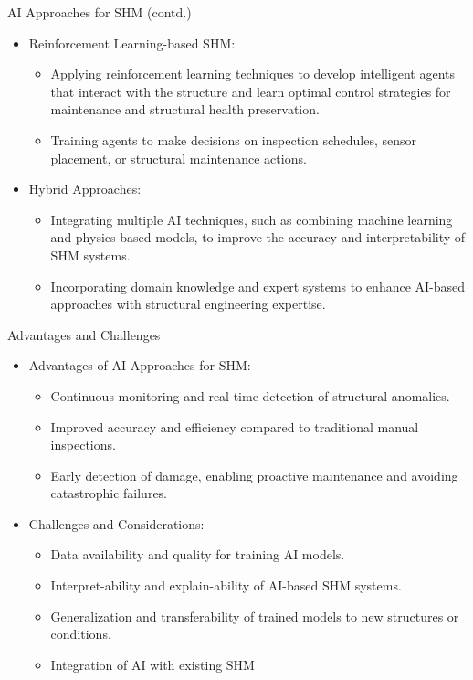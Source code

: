 \documentclass{beamer}
\begin{document}
	\begin{frame}{AI Approaches for SHM (contd.)}
		\begin{itemize}
			\item Reinforcement Learning-based SHM:
			\begin{itemize}
				\item Applying reinforcement learning techniques to develop intelligent agents that interact with the structure and learn optimal control strategies for maintenance and structural health preservation.
				\item Training agents to make decisions on inspection schedules, sensor placement, or structural maintenance actions.
			\end{itemize}
			\item Hybrid Approaches:
			\begin{itemize}
				\item Integrating multiple AI techniques, such as combining machine learning and physics-based models, to improve the accuracy and interpretability of SHM systems.
				\item Incorporating domain knowledge and expert systems to enhance AI-based approaches with structural engineering expertise.
			\end{itemize}
		\end{itemize}
	\end{frame}
	
	\begin{frame}{Advantages and Challenges}
		\begin{itemize}
			\item Advantages of AI Approaches for SHM:
			\begin{itemize}
				\item Continuous monitoring and real-time detection of structural anomalies.
				\item Improved accuracy and efficiency compared to traditional manual inspections.
				\item Early detection of damage, enabling proactive maintenance and avoiding catastrophic failures.
			\end{itemize}
			\item Challenges and Considerations:
			\begin{itemize}
				\item Data availability and quality for training AI models.
				\item Interpret-ability and explain-ability of AI-based SHM systems.
				\item Generalization and transferability of trained models to new structures or conditions.
				\item Integration of AI with existing SHM
			\end{itemize}
		\end{itemize}
		\end{frame}
\end{document}
